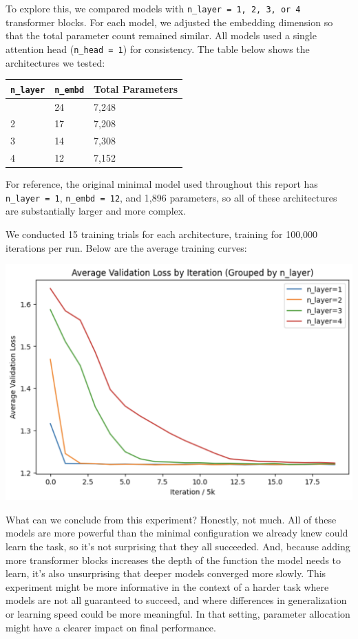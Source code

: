 \documentclass[11pt]{article}
\begin{document}
To explore this, we compared models with
\texttt{n\_layer\ =\ 1,\ 2,\ 3,\ or\ 4} transformer blocks. For each
model, we adjusted the embedding dimension so that the total parameter
count remained similar. All models used a single attention head
(\texttt{n\_head\ =\ 1}) for consistency. The table below shows the
architectures we tested:

\begin{longtable}[]{@{}lll@{}}
\toprule\noalign{}
\texttt{n\_layer} & \texttt{n\_embd} & Total Parameters \\
\midrule\noalign{}
\endhead
\bottomrule\noalign{}
\endlastfoot
1 & 24 & 7,248 \\
2 & 17 & 7,208 \\
3 & 14 & 7,308 \\
4 & 12 & 7,152 \\
\end{longtable}

For reference, the original minimal model used throughout this report
has \texttt{n\_layer\ =\ 1}, \texttt{n\_embd\ =\ 12}, and 1,896
parameters, so all of these architectures are substantially larger and
more complex.

We conducted 15 training trials for each architecture, training for
100,000 iterations per run. Below are the average training curves:

\begin{center}
\includegraphics[keepaspectratio]{inserted_images/diff_layer_runs.png}
\end{center}

What can we conclude from this experiment? Honestly, not much. All of
these models are more powerful than the minimal configuration we already
knew could learn the task, so it's not surprising that they all
succeeded. And, because adding more transformer blocks increases the
depth of the function the model needs to learn, it's also unsurprising
that deeper models converged more slowly. This experiment might be more
informative in the context of a harder task where models are not all
guaranteed to succeed, and where differences in generalization or
learning speed could be more meaningful. In that setting, parameter
allocation might have a clearer impact on final performance.
\end{document}
